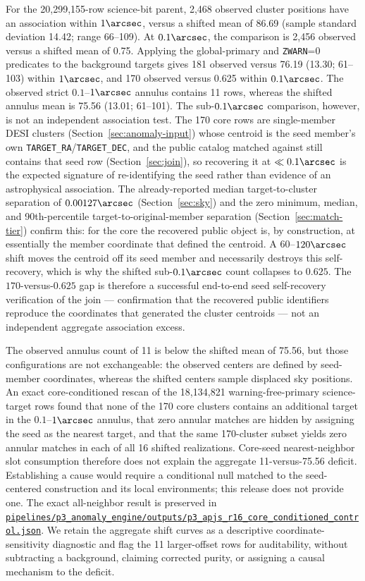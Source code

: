 \documentclass[twocolumn,linenumbers]{aastex702}
\newcommand{\repoBase}{https://github.com/Hubify-Projects/bigbounce/blob/main}
\newcommand{\artifact}[1]{\href{\repoBase/#1}{\nolinkurl{#1}}}
\begin{document}
For the 20,299,155-row science-bit parent, 2,468 observed cluster positions have an association
within $1\arcsec$, versus a shifted mean of 86.69 (sample standard deviation 14.42; range 66--109).
At $0.1\arcsec$, the comparison is 2,456 observed versus a shifted mean of 0.75.  Applying the
global-primary and \texttt{ZWARN}=0 predicates to the background targets gives 181 observed versus
76.19 (13.30; 61--103) within $1\arcsec$, and 170 observed versus 0.625 within $0.1\arcsec$.
The observed strict $0.1$--$1\arcsec$ annulus contains 11 rows, whereas the shifted annulus mean
is 75.56 (13.01; 61--101).  The sub-$0.1\arcsec$ comparison, however, is not an independent
association test.  The 170 core rows are single-member DESI clusters
(Section~\ref{sec:anomaly-input}) whose centroid is the seed member's own
\texttt{TARGET\_RA}/\texttt{TARGET\_DEC}, and the public catalog matched against still contains
that seed row (Section~\ref{sec:join}), so recovering it at $\ll0.1\arcsec$ is the expected
signature of re-identifying the seed rather than evidence of an astrophysical association.  The
already-reported median target-to-cluster separation of $0.00127\arcsec$
(Section~\ref{sec:sky}) and the zero minimum, median, and 90th-percentile
target-to-original-member separation (Section~\ref{sec:match-tier}) confirm this: for the core the
recovered public object is, by construction, at essentially the member coordinate that defined the
centroid.  A $60$--$120\arcsec$ shift moves the centroid off its seed member and necessarily
destroys this self-recovery, which is why the shifted sub-$0.1\arcsec$ count collapses to $0.625$.
The $170$-versus-$0.625$ gap is therefore a successful end-to-end seed self-recovery verification
of the join --- confirmation that the recovered public identifiers reproduce the coordinates that
generated the cluster centroids --- not an independent aggregate association excess.

The observed annulus count of 11 is below the shifted mean of 75.56, but those configurations are
not exchangeable: the observed centers are defined by seed-member coordinates, whereas the shifted
centers sample displaced sky positions.  An exact core-conditioned rescan of the 18,134,821
warning-free-primary science-target rows found that none of the 170 core clusters contains an
additional target in the $0.1$--$1\arcsec$ annulus, that zero annular matches are hidden by assigning
the seed as the nearest target, and that the same 170-cluster subset yields zero annular matches in
each of all 16 shifted realizations.  Core-seed nearest-neighbor slot consumption therefore does not
explain the aggregate 11-versus-75.56 deficit.  Establishing a cause would require a conditional
null matched to the seed-centered construction and its local environments; this release does not
provide one.  The exact all-neighbor result is preserved in
\artifact{pipelines/p3\_anomaly\_engine/outputs/p3\_apjs\_r16\_core\_conditioned\_control.json}.
We retain the aggregate shift curves as a descriptive coordinate-sensitivity
diagnostic and flag the 11 larger-offset rows for auditability, without subtracting a background,
claiming corrected purity, or assigning a causal mechanism to the deficit.
\end{document}
